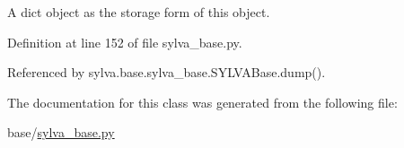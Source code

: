 A dict object as the storage form of this object. 



Definition at line 152 of file sylva\+\_\+base.\+py.



Referenced by sylva.\+base.\+sylva\+\_\+base.\+S\+Y\+L\+V\+A\+Base.\+dump().



The documentation for this class was generated from the following file\+:\begin{DoxyCompactItemize}
\item 
base/\hyperlink{sylva__base_8py}{sylva\+\_\+base.\+py}\end{DoxyCompactItemize}
